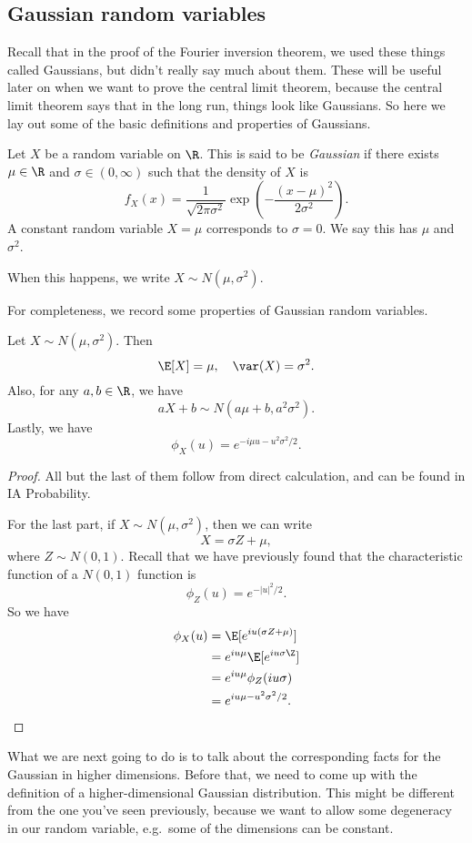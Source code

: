 \documentclass[a4paper]{article}
\begin{document}
\subsection{Gaussian random variables}
Recall that in the proof of the Fourier inversion theorem, we used these things called Gaussians, but didn't really say much about them. These will be useful later on when we want to prove the central limit theorem, because the central limit theorem says that in the long run, things look like Gaussians. So here we lay out some of the basic definitions and properties of Gaussians.

\begin{defi}
  Let $X$ be a random variable on $\R$. This is said to be \emph{Gaussian} if there exists $\mu \in \R$ and $\sigma \in (0, \infty)$ such that the density of $X$ is
  \[
    f_X(x) = \frac{1}{\sqrt{2\pi \sigma^2}} \exp\left(-\frac{(x - \mu)^2}{2 \sigma^2}\right).
  \]
  A constant random variable $X = \mu$ corresponds to $\sigma = 0$. We say this has  $\mu$ and  $\sigma^2$.

  When this happens, we write $X \sim N(\mu, \sigma^2)$.
\end{defi}

For completeness, we record some properties of Gaussian random variables.

\begin{prop}
  Let $X \sim N(\mu, \sigma^2)$. Then
  \[
    \E[X] = \mu,\quad \var(X) = \sigma^2.
  \]
  Also, for any $a, b \in \R$, we have
  \[
    aX + b \sim N(a\mu + b, a^2 \sigma^2).
  \]
  Lastly, we have
  \[
    \phi_X(u) = e^{-i\mu u - u^2 \sigma^2/2}.
  \]
\end{prop}

\begin{proof}
  All but the last of them follow from direct calculation, and can be found in IA Probability.

  For the last part, if $X \sim N(\mu, \sigma^2)$, then we can write
  \[
    X = \sigma Z + \mu,
  \]
  where $Z \sim N(0, 1)$. Recall that we have previously found that the characteristic function of a $N(0, 1)$ function is
  \[
    \phi_Z(u) = e^{-|u|^2/2}.
  \]
  So we have
  \begin{align*}
    \phi_X(u) &= \E[e^{iu(\sigma Z + \mu)}]\\
    &= e^{iu\mu} \E[e^{iu\sigma \Z}]\\
    &= e^{iu\mu} \phi_Z(iu\sigma)\\
    &= e^{iu \mu - u^2 \sigma^2/2}.
  \end{align*}
\end{proof}
What we are next going to do is to talk about the corresponding facts for the Gaussian in higher dimensions. Before that, we need to come up with the definition of a higher-dimensional Gaussian distribution. This might be different from the one you've seen previously, because we want to allow some degeneracy in our random variable, e.g.\ some of the dimensions can be constant.
\end{document}
